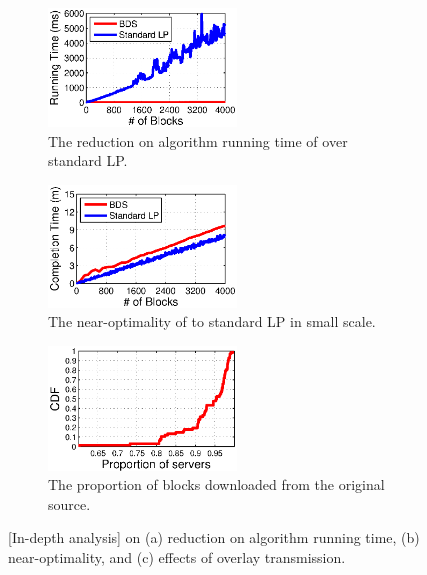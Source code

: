 \begin{figure}[t]
        \centering
        \begin{subfigure}[b]{0.3\textwidth}
                \centering
                \includegraphics[width=50mm]{images/BDSvsLP.eps} %
                \caption{The reduction on algorithm running time of \name over standard LP.}
                \label{fig:further:BDSvsLP}
        \end{subfigure}
        \begin{subfigure}[b]{0.3\textwidth}
                \centering
                \includegraphics[width=50mm]{images/BDSvsLP_CT.eps}%
                \caption{The near-optimality of \name to standard LP in small scale.}
                \label{fig:further:BDSvsLP_CT}
        \end{subfigure}
        \begin{subfigure}[b]{0.3\textwidth}
                \centering
                \includegraphics[width=50mm]{images/overlay.eps}
                \caption{The proportion of blocks downloaded from the original source.}
                \label{fig:further:overlay}
        \end{subfigure}
        \caption{[In-depth analysis] on (a) reduction on algorithm running time, (b) near-optimality, and (c) effects of overlay transmission.}
        \label{fig:further}
\vspace{-0.4cm}
\end{figure}

